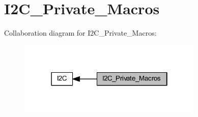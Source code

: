 \hypertarget{group___i2_c___private___macros}{}\section{I2\+C\+\_\+\+Private\+\_\+\+Macros}
\label{group___i2_c___private___macros}
Collaboration diagram for I2\+C\+\_\+\+Private\+\_\+\+Macros\+:
\nopagebreak
\begin{figure}[H]
\begin{center}
\leavevmode
\includegraphics[width=250pt]{group___i2_c___private___macros}
\end{center}
\end{figure}
